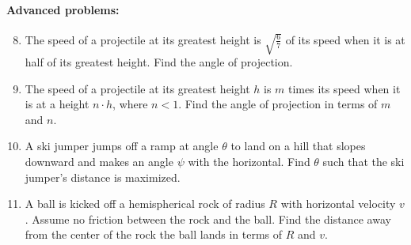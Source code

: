 \documentclass[12pt,letterpaper]{article}
\begin{document}
\paragraph{Advanced problems:}
\begin{enumerate}
\setcounter{enumi}{7}
\item
The speed of a projectile at its greatest height is $\sqrt{\frac{6}{7}}$ of its speed when it is at half of its greatest height. Find the angle of projection.

\item
The speed of a projectile at its greatest height $h$ is $m$ times its speed when it is at a height $n\cdot h$, where $n < 1$. Find the angle of projection in terms of $m$ and $n$.

\item
A ski jumper jumps off a ramp at angle $\theta$ to land on a hill that slopes downward and makes an angle $\psi$ with the horizontal. Find $\theta$ such that the ski jumper's distance is maximized.

\item
A ball is kicked off a hemispherical rock of radius $R$ with horizontal velocity $v$. Assume no friction between the rock and the ball. Find the distance away from the center of the rock the ball lands in terms of $R$ and $v$.
\end{enumerate}
\end{document}
